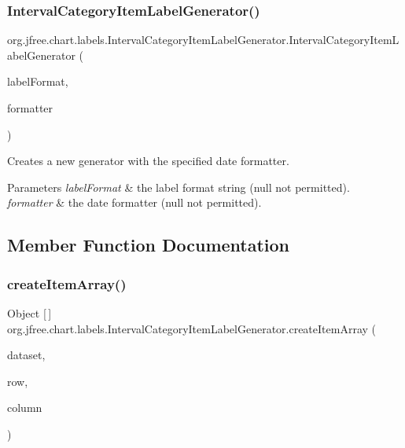 \subsubsection{\texorpdfstring{Interval\+Category\+Item\+Label\+Generator()}{IntervalCategoryItemLabelGenerator()}\hspace{0.1cm}{\footnotesize\ttfamily [3/3]}}
{\footnotesize\ttfamily org.\+jfree.\+chart.\+labels.\+Interval\+Category\+Item\+Label\+Generator.\+Interval\+Category\+Item\+Label\+Generator (\begin{DoxyParamCaption}\item[{String}]{label\+Format,  }\item[{Date\+Format}]{formatter }\end{DoxyParamCaption})}

Creates a new generator with the specified date formatter.


\begin{DoxyParams}{Parameters}
{\em label\+Format} & the label format string ({\ttfamily null} not permitted). \\
\hline
{\em formatter} & the date formatter ({\ttfamily null} not permitted). \\
\hline
\end{DoxyParams}


\subsection{Member Function Documentation}
\mbox{\label{classorg_1_1jfree_1_1chart_1_1labels_1_1_interval_category_item_label_generator_a192386ce9e7949492c2b885a2742f801}} 
\subsubsection{\texorpdfstring{create\+Item\+Array()}{createItemArray()}}
{\footnotesize\ttfamily Object \mbox{[}$\,$\mbox{]} org.\+jfree.\+chart.\+labels.\+Interval\+Category\+Item\+Label\+Generator.\+create\+Item\+Array (\begin{DoxyParamCaption}\item[{\mbox{\hyperlink{interfaceorg_1_1jfree_1_1data_1_1category_1_1_category_dataset}{Category\+Dataset}}}]{dataset,  }\item[{int}]{row,  }\item[{int}]{column }\end{DoxyParamCaption})\hspace{0.3cm}{\ttfamily [protected]}}

